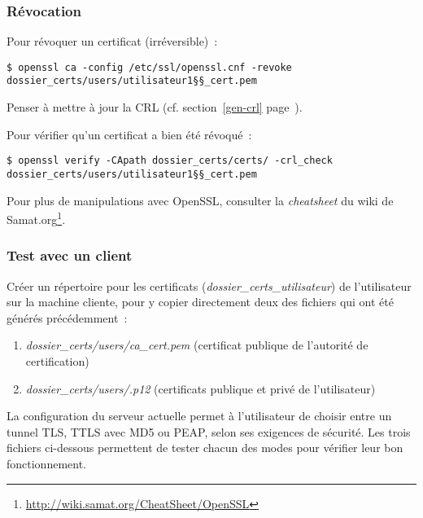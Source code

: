 \subsubsection{Révocation}

Pour révoquer un certificat (irréversible)~: 

\begin{lstlisting}
$ openssl ca -config /etc/ssl/openssl.cnf -revoke dossier_certs/users/utilisateur1§§_cert.pem
\end{lstlisting}

Penser à mettre à jour la CRL (cf. section~\ref{gen-crl} page~\pageref{gen-crl}).

Pour vérifier qu'un certificat a bien été révoqué~:

\begin{lstlisting}
$ openssl verify -CApath dossier_certs/certs/ -crl_check dossier_certs/users/utilisateur1§§_cert.pem
\end{lstlisting}

{\Large\Info} Pour plus de manipulations avec OpenSSL, consulter la \emph{cheatsheet} du wiki de Samat.org\footnote{\url{http://wiki.samat.org/CheatSheet/OpenSSL}}.

\label{tests-certificats}
\subsubsection{Test avec un client}

Créer un répertoire pour les certificats (\emph{dossier\_certs\_utilisateur}) de l'utilisateur sur la machine cliente, pour y copier directement deux des fichiers qui ont été générés précédemment~:

\begin{enumerate}
\item \emph{dossier\_certs/users/ca\_cert.pem} (certificat publique de l'autorité de certification)
\item \emph{dossier\_certs/users/{}.p12} (certificats publique et privé de l'utilisateur)
\end{enumerate}

La configuration du serveur actuelle permet à l'utilisateur de choisir entre un tunnel TLS, TTLS avec MD5 ou PEAP, selon ses exigences de sécurité. Les trois fichiers ci-dessous permettent de tester chacun des modes pour vérifier leur bon fonctionnement.


